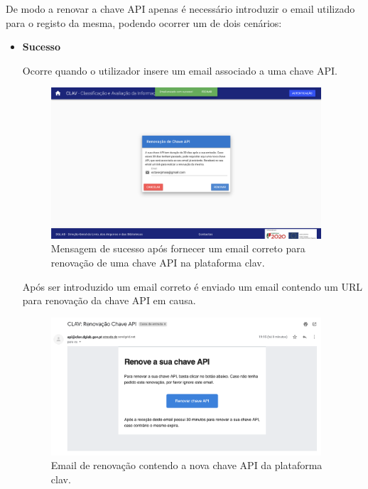 De modo a renovar a chave API apenas é necessário introduzir o email utilizado para o registo da mesma, podendo ocorrer um de dois cenários:

\begin{itemize}
    \item \textbf{Sucesso}
    
    Ocorre quando o utilizador insere um email associado a uma chave API.
    
    \begin{figure}[H]
        \centering
        \includegraphics[width=0.95\textwidth]{img/clav/authAPI/sucessoRenovacao.png}
        \caption{Mensagem de sucesso após fornecer um email correto para renovação de uma chave API na plataforma \gls{clav}.}
        \label{fig:renovarChaveApiSucesso}
    \end{figure}
    
    Após ser introduzido um email correto é enviado um email contendo um URL para renovação da chave API em causa.
    
    \begin{figure}[H]
        \centering
        \includegraphics[width=0.95\textwidth]{img/clav/authAPI/emailRenovar.png}
        \caption{Email de renovação contendo a nova chave API da plataforma \gls{clav}.}
        \label{fig:emailRenovacaoChaveApi}
    \end{figure}
    

\end{itemize}
